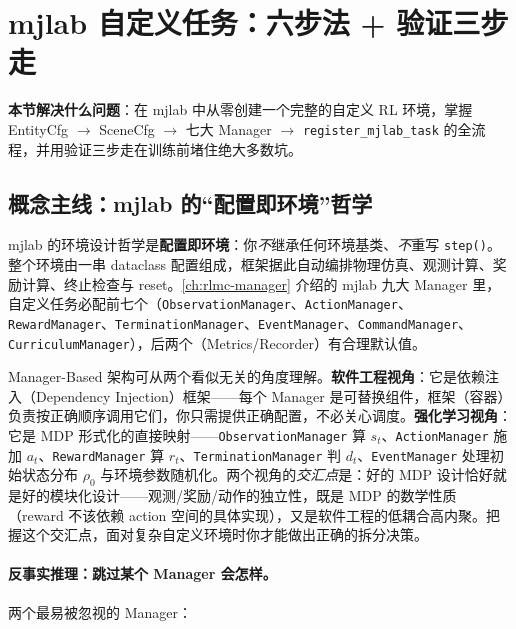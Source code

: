 \section{mjlab 自定义任务：六步法 + 验证三步走}
\label{sec:rlmc-diy-mjlab}

\textbf{本节解决什么问题}：在 mjlab 中从零创建一个完整的自定义 RL 环境，掌握 EntityCfg $\to$ SceneCfg $\to$ 七大 Manager $\to$ \texttt{register\_mjlab\_task} 的全流程，并用验证三步走在训练前堵住绝大多数坑。

\subsection{概念主线：mjlab 的“配置即环境”哲学}
\label{sec:rlmc-diy-mjlab-philosophy}

mjlab 的环境设计哲学是\textbf{配置即环境}：你\emph{不}继承任何环境基类、\emph{不}重写 \verb|step()|。整个环境由一串 dataclass 配置组成，框架据此自动编排物理仿真、观测计算、奖励计算、终止检查与 reset。\cref{ch:rlmc-manager} 介绍的 mjlab 九大 Manager 里，自定义任务必配前七个（\verb|ObservationManager|、\verb|ActionManager|、\verb|RewardManager|、\verb|TerminationManager|、\verb|EventManager|、\verb|CommandManager|、\verb|CurriculumManager|），后两个（Metrics/Recorder）有合理默认值。

\begin{insight}\label{ins:rlmc-diy-di}
Manager-Based 架构可从两个看似无关的角度理解。\textbf{软件工程视角}：它是依赖注入（Dependency Injection）框架——每个 Manager 是可替换组件，框架（容器）负责按正确顺序调用它们，你只需提供正确配置，不必关心调度。\textbf{强化学习视角}：它是 MDP 形式化的直接映射——\verb|ObservationManager| 算 $s_t$、\verb|ActionManager| 施加 $a_t$、\verb|RewardManager| 算 $r_t$、\verb|TerminationManager| 判 $d_t$、\verb|EventManager| 处理初始状态分布 $\rho_0$ 与环境参数随机化。两个视角的\emph{交汇点}是：好的 MDP 设计恰好就是好的模块化设计——观测/奖励/动作的独立性，既是 MDP 的数学性质（reward 不该依赖 action 空间的具体实现），又是软件工程的低耦合高内聚。把握这个交汇点，面对复杂自定义环境时你才能做出正确的拆分决策。
\end{insight}

\paragraph{反事实推理：跳过某个 Manager 会怎样。}两个最易被忽视的 Manager：

